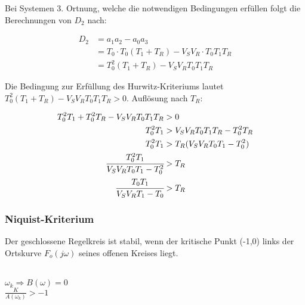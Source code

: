 Bei Systemen 3. Ortnung, welche die notwendigen Bedingungen erfüllen folgt die Berechnungen von $D_2$ nach:

\begin{equation} \label{eg3}
 \begin{split}
 D_2 &= a_1a_2-a_0a_3 \\
 &= T_0 \cdot T_0(T_1+T_R) - V_SV_R \cdot T_0T_1T_R \\
 &= T_0^2 (T_1+T_R) - V_SV_RT_0T_1T_R 
\end{split}
\end{equation}

Die Bedingung zur Erfüllung des Hurwitz-Kriteriums lautet $T_0^2 (T_1+T_R) - V_SV_RT_0T_1T_R  > 0$. Auflösung nach $T_R$:

\begin{equation} \label{eg3}
 \begin{split}
 T_0^2T_1+T_0^2T_R - V_SV_RT_0T_1T_R  &> 0 \\
 T_0^2T_1   &> V_SV_RT_0T_1T_R - T_0^2T_R\\
 T_0^2T_1  &> T_R(V_SV_RT_0T_1 - T_0^2) \\
 \cfrac{T_0^2T_1}{V_SV_RT_0T_1 - T_0^2} &> T_R \\
 \cfrac{T_0T_1}{V_SV_RT_1 - T_0} &> T_R
\end{split}
\end{equation}

\subsubsection{Niquist-Kriterium}
Der geschlossene Regelkreis ist stabil, wenn der kritische Punkt (-1,0) links der Ortskurve $F_o(j\omega)$ seines offenen Kreises liegt.

\begin{minipage}{0.45\textwidth}

 \\
$\omega_k \Rightarrow B(\omega) = 0$ \\
$\frac{K}{A(\omega_k)} > -1 $
\end{minipage}
\begin{minipage}{0.45\textwidth}

\end{minipage}

